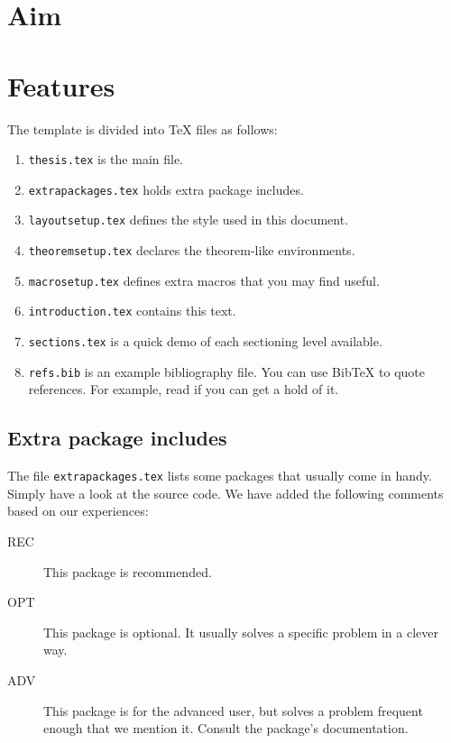 \section{Aim}

\section{Features}
\label{sec:features}

The template is divided into \TeX{} files as follows:
\begin{enumerate}
\item \texttt{thesis.tex} is the main file.
\item \texttt{extrapackages.tex} holds extra package includes.
\item \texttt{layoutsetup.tex} defines the style used in this document.
\item \texttt{theoremsetup.tex} declares the theorem-like environments.
\item \texttt{macrosetup.tex} defines extra macros that you may find
  useful.
\item \texttt{introduction.tex} contains this text.
\item \texttt{sections.tex} is a quick demo of each sectioning level
  available.
\item \texttt{refs.bib} is an example bibliography file.  You can use
  Bib\TeX{} to quote references.  For example, read
  \cite{bringhurst1996ets} if you can get a hold of it.
\end{enumerate}


\subsection{Extra package includes}

The file \texttt{extrapackages.tex} lists some packages that usually
come in handy.  Simply have a look at the source code.  We have
added the following comments based on our experiences:
\begin{description}
\item[REC] This package is recommended.
\item[OPT] This package is optional.  It usually solves a specific
  problem in a clever way.
\item[ADV] This package is for the advanced user, but solves a problem
  frequent enough that we mention it. Consult the package's
  documentation.
\end{description}


